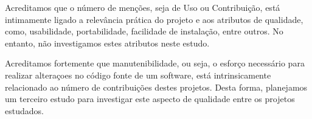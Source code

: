 Acreditamos que o número de menções, seja de Uso ou Contribuição, está
intimamente ligado a relevância prática do projeto e aos atributos de
qualidade, como, usabilidade, portabilidade, facilidade de instalação, entre
outros. No entanto, não investigamos estes atributos neste estudo.

Acreditamos fortemente que manutenibilidade, ou seja, o esforço necessário para
realizar alteraçoes no código fonte de um software, está intrinsicamente
relacionado ao número de contribuições destes projetos. Desta forma, planejamos
um terceiro estudo para investigar este aspecto de qualidade entre os projetos
estudados.




%





